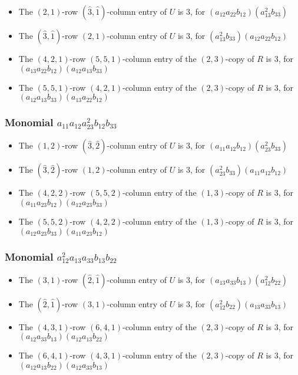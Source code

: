 \documentclass{article}
\begin{document}
\begin{itemize}
\item The $ \left(2, 1\right) $-row $ (\hat{3}, \hat{1}) $-column entry of $U$ is $ 3 $, for $( a_{12} a_{22} b_{12} )( a_{13}^{2} b_{33} )$ 
\item The $(\hat{3}, \hat{1})$-row $ \left(2, 1\right) $-column entry of $U$ is $ 3 $, for $( a_{13}^{2} b_{33} )( a_{12} a_{22} b_{12} )$ 
\item The $(4, 2, 1)$-row $(5, 5, 1)$-column entry of the $ \left(2, 3\right) $-copy of $R$ is $ 3 $, for $( a_{13} a_{22} b_{12} )( a_{12} a_{13} b_{33} )$ 
\item The $(5, 5, 1)$-row $(4, 2, 1)$-column entry of the $ \left(2, 3\right) $-copy of $R$ is $ 3 $, for $( a_{12} a_{13} b_{33} )( a_{13} a_{22} b_{12} )$ 
\end{itemize}
\subsubsection{Monomial $ a_{11} a_{12} a_{23}^{2} b_{12} b_{33} $}

\begin{itemize}
\item The $ \left(1, 2\right) $-row $ (\hat{3}, \hat{2}) $-column entry of $U$ is $ 3 $, for $( a_{11} a_{12} b_{12} )( a_{23}^{2} b_{33} )$ 
\item The $(\hat{3}, \hat{2})$-row $ \left(1, 2\right) $-column entry of $U$ is $ 3 $, for $( a_{23}^{2} b_{33} )( a_{11} a_{12} b_{12} )$ 
\item The $(4, 2, 2)$-row $(5, 5, 2)$-column entry of the $ \left(1, 3\right) $-copy of $R$ is $ 3 $, for $( a_{11} a_{23} b_{12} )( a_{12} a_{23} b_{33} )$ 
\item The $(5, 5, 2)$-row $(4, 2, 2)$-column entry of the $ \left(1, 3\right) $-copy of $R$ is $ 3 $, for $( a_{12} a_{23} b_{33} )( a_{11} a_{23} b_{12} )$ 
\end{itemize}
\subsubsection{Monomial $ a_{12}^{2} a_{13} a_{33} b_{13} b_{22} $}

\begin{itemize}
\item The $ \left(3, 1\right) $-row $ (\hat{2}, \hat{1}) $-column entry of $U$ is $ 3 $, for $( a_{13} a_{33} b_{13} )( a_{12}^{2} b_{22} )$ 
\item The $(\hat{2}, \hat{1})$-row $ \left(3, 1\right) $-column entry of $U$ is $ 3 $, for $( a_{12}^{2} b_{22} )( a_{13} a_{33} b_{13} )$ 
\item The $(4, 3, 1)$-row $(6, 4, 1)$-column entry of the $ \left(2, 3\right) $-copy of $R$ is $ 3 $, for $( a_{12} a_{33} b_{13} )( a_{12} a_{13} b_{22} )$ 
\item The $(6, 4, 1)$-row $(4, 3, 1)$-column entry of the $ \left(2, 3\right) $-copy of $R$ is $ 3 $, for $( a_{12} a_{13} b_{22} )( a_{12} a_{33} b_{13} )$ 
\end{itemize}
\end{document}
